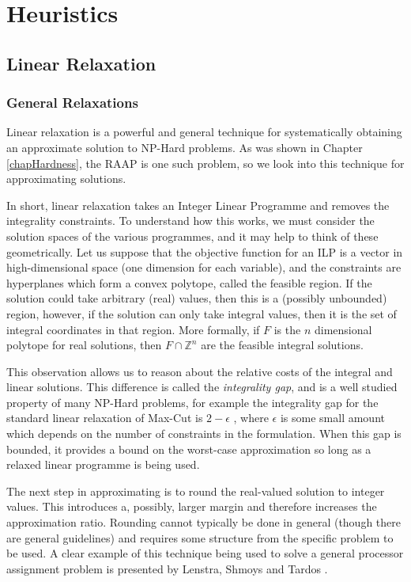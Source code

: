 \chapter{Heuristics}
\label{chapAlgos}

\section{Linear Relaxation}

\subsection{General Relaxations}
\label{secAlgRelax}

Linear relaxation is a powerful and general technique for systematically obtaining an approximate solution to NP-Hard problems.
As was shown in Chapter \ref{chapHardness}, the RAAP is one such problem, so we look into this technique for approximating solutions.

In short, linear relaxation takes an Integer Linear Programme and removes the integrality constraints.
To understand how this works, we must consider the solution spaces of the various programmes, and it may help to think of these geometrically.
Let us suppose that the objective function for an ILP is a vector in high-dimensional space (one dimension for each variable), and the constraints are hyperplanes which form a convex polytope, called the feasible region.
If the solution could take arbitrary (real) values, then this is a (possibly unbounded) region, however, if the solution can only take integral values, then it is the set of integral coordinates in that region.
More formally, if $F$ is the $n$ dimensional polytope for real solutions, then $F \cap \mathbb{Z}^n$ are the feasible integral solutions.

This observation allows us to reason about the relative costs of the integral and linear solutions.
This difference is called the {\em integrality gap}, and is a well studied property of many NP-Hard problems, for example the integrality gap for the standard linear relaxation of Max-Cut is $2-\epsilon$ \cite{fer07}, where $\epsilon$ is some small amount which depends on the number of constraints in the formulation.
When this gap is bounded, it provides a bound on the worst-case approximation so long as a relaxed linear programme is being used.

The next step in approximating is to round the real-valued solution to integer values.
This introduces a, possibly, larger margin and therefore increases the approximation ratio.
Rounding cannot typically be done in general (though there are general guidelines) and requires some structure from the specific problem to be used.
A clear example of this technique being used to solve a general processor assignment problem is presented by Lenstra, Shmoys and Tardos \cite{len87}.

